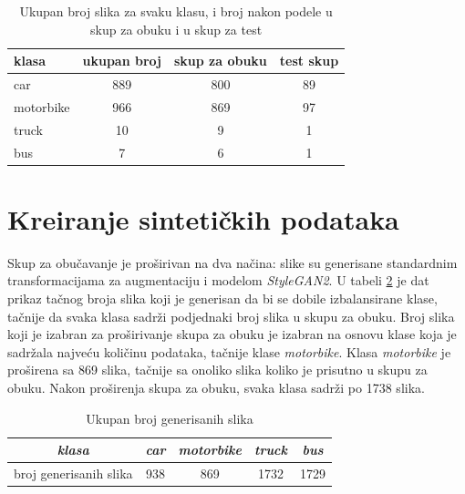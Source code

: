 \documentclass[12pt,oneside]{memoir}
\begin{document}
\begin{table}[htb]
    \begin{center}
    \caption{Ukupan broj slika za svaku klasu, i broj nakon podele u skup za obuku i u skup za test }\label{tab:section4_dostpunipodaci}
    \begin{tabular}{l|c|c|c}
    klasa & ukupan broj & skup za obuku & test skup\\ 
    \hline
    car & 889 & 800 & 89 \\
    motorbike & 966 & 869 & 97 \\
    truck & 10 & 9 & 1 \\
    bus & 7 & 6 & 1 \\
    \end{tabular}
    \end{center}
\end{table}


\section{Kreiranje sintetičkih podataka}

Skup za obučavanje je proširivan na dva načina: slike su generisane standardnim transformacijama za augmentaciju i modelom \textit{StyleGAN2}. U tabeli \ref{tab:section4_generisaneslike} je dat prikaz tačnog broja slika koji je generisan da bi se dobile izbalansirane klase, tačnije da svaka klasa sadrži podjednaki broj slika u skupu za obuku. 
Broj slika koji je izabran za proširivanje skupa za obuku je izabran na osnovu klase koja je sadržala najveću količinu podataka, tačnije klase \textit{motorbike}. Klasa \textit{motorbike} je proširena sa 869 slika, tačnije sa onoliko slika koliko je prisutno u skupu za obuku. Nakon proširenja skupa za obuku, svaka klasa sadrži po 1738 slika.

\begin{table}[h!]
    \begin{center}
    \caption{Ukupan broj generisanih slika}\label{tab:section4_generisaneslike}
    \begin{tabular}{c|c|c|c|c}
        \textit{klasa} & \textit{car} &  \textit{motorbike} &  \textit{truck} & \textit{bus} \\ 
        \hline
        broj generisanih slika & 938 & 869 & 1732 & 1729 \\ 
    \end{tabular}
    \end{center}
\end{table}
\end{document}
